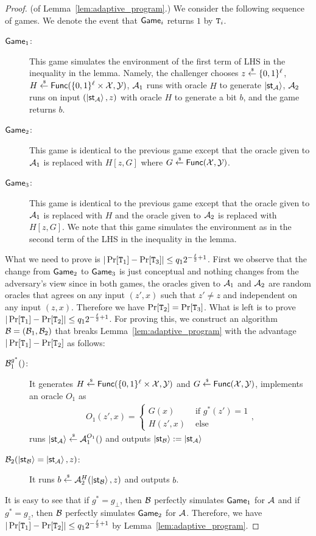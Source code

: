 \begin{proof}(of Lemma~\ref{lem:adaptive_program}.)
We consider the following sequence of games.
We denote the event that $\mathsf{Game}_i$ returns $1$ by $\mathtt{T}_i$.
\begin{description}
\item[$\mathsf{Game}_1$:] This game simulates the environment of the first term of LHS in the inequality in the lemma. Namely, the challenger chooses $z\overset{\hspace{0.1em}\mathsf{\scriptscriptstyle\$}}{\leftarrow} \{0,1\}^{\ell}$, $H\overset{\hspace{0.1em}\mathsf{\scriptscriptstyle\$}}{\leftarrow} \mathsf{Func}(\{0,1\}^{\ell}\times \mathcal{X},\mathcal{Y})$, $\mathcal{A}_1$ runs with oracle $H$ to generate $\ket{\mathsf{st}_{\mathcal{A}}}$, $\mathcal{A}_2$ runs on input $(\ket{\mathsf{st}_{\mathcal{A}}},z)$ with oracle $H$ to generate a bit $b$, and the game returns $b$.
\item[$\mathsf{Game}_2$:] This game is identical to the previous game except that the oracle given to $\mathcal{A}_1$ is replaced with $H[z,G]$ where $G\overset{\hspace{0.1em}\mathsf{\scriptscriptstyle\$}}{\leftarrow} \mathsf{Func}(\mathcal{X},\mathcal{Y})$.
\item[$\mathsf{Game}_3$:] This game is identical to the previous game except that the oracle given to $\mathcal{A}_1$ is replaced with $H$ and the oracle given to $\mathcal{A}_2$ is replaced with $H[z,G]$.
We note that this game simulates the environment as in the second term of the LHS in the inequality in the lemma.
\end{description}
What we need to prove is $|\Pr[\mathtt{T}_1]-\Pr[\mathtt{T}_3]|\leq q_12^{-\frac{\ell}{2}+1}$.
First we observe that the change from $\mathsf{Game}_2$ to $\mathsf{Game}_3$ is just conceptual and nothing changes from the adversary's view since in both games, the oracles given to $\mathcal{A}_1$ and $\mathcal{A}_2$ are random oracles that agrees on any input $(z',x)$ such that $z'\neq z$ and independent on any input $(z,x)$.
Therefore we have $\Pr[\mathtt{T}_2]=\Pr[\mathtt{T}_3]$.
What is left is to prove $|\Pr[\mathtt{T}_1]-\Pr[\mathtt{T}_2]|\leq q_12^{-\frac{\ell}{2}+1}$.
For proving this, we construct an algorithm $\mathcal{B}=(\mathcal{B}_1,\mathcal{B}_2)$ that breaks Lemma~\ref{lem:adaptive_program} with the advantage $|\Pr[\mathtt{T}_1]-\Pr[\mathtt{T}_2]$ as follows:

\begin{description}
\item[$\mathcal{B}_1^{g^*}()$:] It generates $H\overset{\hspace{0.1em}\mathsf{\scriptscriptstyle\$}}{\leftarrow} \mathsf{Func}(\{0,1\}^{\ell}\times \mathcal{X},\mathcal{Y})$ and  $G\overset{\hspace{0.1em}\mathsf{\scriptscriptstyle\$}}{\leftarrow} \mathsf{Func}(\mathcal{X},\mathcal{Y})$, implements an oracle $O_1$ as
\begin{align*}
O_1(z',x)=
\begin{cases}
G(x) &\text{~if~}g^*(z')=1 \\
H(z',x) &\text{~else}
\end{cases},    
\end{align*}
runs $\ket{\mathsf{st}_{\mathcal{A}}}\overset{\hspace{0.1em}\mathsf{\scriptscriptstyle\$}}{\leftarrow}\mathcal{A}_1^{O_1}()$ and outputs $\ket{\mathsf{st}_{\mathcal{B}}}:= \ket{\mathsf{st}_{\mathcal{A}}}$
\item[$\mathcal{B}_2(\ket{\mathsf{st}_{\mathcal{B}}}=\ket{\mathsf{st}_{\mathcal{A}}},z)$:]
It runs $b \overset{\hspace{0.1em}\mathsf{\scriptscriptstyle\$}}{\leftarrow} \mathcal{A}_2^{H}(\ket{\mathsf{st}_{\mathcal{B}}},z)$ and outputs $b$.
\end{description}
It is easy to see that if $g^*=g_{\bot}$, then $\mathcal{B}$ perfectly simulates $\mathsf{Game}_1$ for $\mathcal{A}$ and if $g^*=g_z$, then $\mathcal{B}$ perfectly simulates $\mathsf{Game}_2$ for $\mathcal{A}$.
Therefore, we have $|\Pr[\mathtt{T}_1]-\Pr[\mathtt{T}_2]|\leq q_12^{-\frac{\ell}{2}+1}$ by Lemma~\ref{lem:adaptive_program}.
\end{proof} 